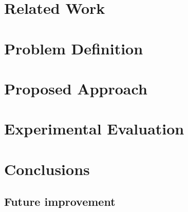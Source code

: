\documentclass{acm_proc_article-sp-sigmod07}
\begin{document}
\section*{Related Work}


\section*{Problem Definition}


\section*{Proposed Approach}


\section*{Experimental Evaluation}


\section*{Conclusions}
\subsection*{Future improvement}
\end{document}
